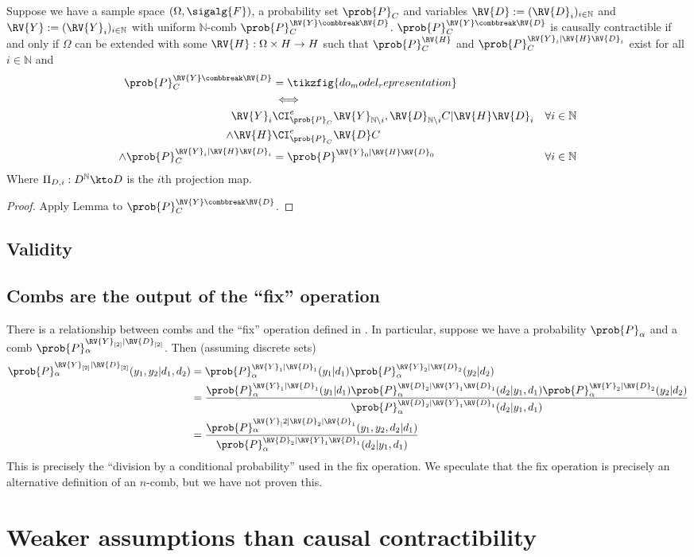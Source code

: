 \begin{theorem}[]\label{th:response_hdep}
Suppose we have a sample space $(\Omega,\sigalg{F})$, a probability set $\prob{P}_C$ and variables $\RV{D}:=(\RV{D}_i)_{i\in \mathbb{N}}$ and $\RV{Y}:=(\RV{Y}_i)_{i\in \mathbb{N}}$ with uniform $\mathbb{N}$-comb $\prob{P}_C^{\RV{Y}\combbreak \RV{D}}$. $\prob{P}_C^{\RV{Y}\combbreak \RV{D}}$ is causally contractible if and only if $\Omega$ can be extended with some $\RV{H}:\Omega\times H\to H$ such that $\prob{P}^{\RV{H}}_C$ and $\prob{P}_C^{\RV{Y}_i|\RV{H}\RV{D}_i}$ exist for all $i\in \mathbb{N}$ and
\begin{align}
    \prob{P}_C^{\RV{Y}\combbreak\RV{D}} &= \tikzfig{do_model_representation}\\
    &\iff\\
    \RV{Y}_i&\CI^e_{\prob{P}_C} \RV{Y}_{\mathbb{N}\setminus i},\RV{D}_{\mathbb{N}\setminus i}C|\RV{H}\RV{D}_i&\forall i\in \mathbb{N}\\
    \land \RV{H} &\CI^e_{\prob{P}_C} \RV{D} C\\
    \land \prob{P}_C^{\RV{Y}_i|\RV{H}\RV{D}_i} &= \prob{P}^{\RV{Y}_0|\RV{H}\RV{D}_0} & \forall i\in \mathbb{N}
\end{align}
Where $\Pi_{D,i}:D^\mathbb{N}\kto D$ is the $i$th projection map.
\end{theorem}

\begin{proof}
Apply Lemma  to $\prob{P}_C^{\RV{Y}\combbreak \RV{D}}$.
\end{proof}

\subsection{Validity}

\subsection{Combs are the output of the ``fix'' operation}

There is a relationship between combs and the ``fix'' operation defined in \citet{richardson_nested_2017}. In particular, suppose we have a probability $\prob{P}_\alpha$ and a comb $\prob{P}_\alpha^{\RV{Y}_{[2]}|\RV{D}_{[2]}}$. Then (assuming discrete sets)
\begin{align}
    \prob{P}_\alpha^{\RV{Y}_{[2]}|\RV{D}_{[2]}}(y_1,y_2|d_1,d_2) &= \prob{P}_\alpha^{\RV{Y}_1|\RV{D}_1}(y_1|d_1)\prob{P}_\alpha^{\RV{Y}_2|\RV{D}_2}(y_2|d_2)\\
    &= \frac{\prob{P}_\alpha^{\RV{Y}_1|\RV{D}_1}(y_1|d_1)\prob{P}_\alpha^{\RV{D}_2|\RV{Y}_1\RV{D}_1}(d_2|y_1,d_1)\prob{P}_\alpha^{\RV{Y}_2|\RV{D}_2}(y_2|d_2)}{\prob{P}_\alpha^{\RV{D}_2|\RV{Y}_1\RV{D}_1}(d_2|y_1,d_1)}\\
    &= \frac{\prob{P}_\alpha^{\RV{Y}_[2]\RV{D}_2|\RV{D}_1}(y_1,y_2,d_2|d_1)}{\prob{P}_\alpha^{\RV{D}_2|\RV{Y}_1\RV{D}_1}(d_2|y_1,d_1)}
\end{align}
This is precisely the ``division by a conditional probability'' used in the fix operation. We speculate that the fix operation is precisely an alternative definition of an $n$-comb, but we have not proven this.


\section{Weaker assumptions than causal contractibility}

